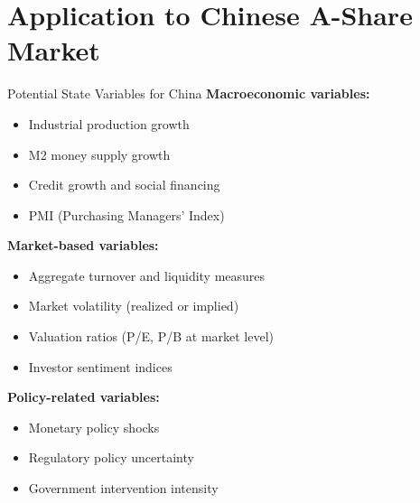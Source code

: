 \documentclass{beamer}
\begin{document}
\section{Application to Chinese A-Share Market}

\begin{frame}{Potential State Variables for China}
\textbf{Macroeconomic variables:}
\begin{itemize}
\item Industrial production growth
\item M2 money supply growth
\item Credit growth and social financing
\item PMI (Purchasing Managers' Index)
\end{itemize}

\vspace{0.3cm}
\textbf{Market-based variables:}
\begin{itemize}
\item Aggregate turnover and liquidity measures
\item Market volatility (realized or implied)
\item Valuation ratios (P/E, P/B at market level)
\item Investor sentiment indices
\end{itemize}

\vspace{0.3cm}
\textbf{Policy-related variables:}
\begin{itemize}
\item Monetary policy shocks
\item Regulatory policy uncertainty
\item Government intervention intensity
\end{itemize}
\end{frame}
\end{document}
